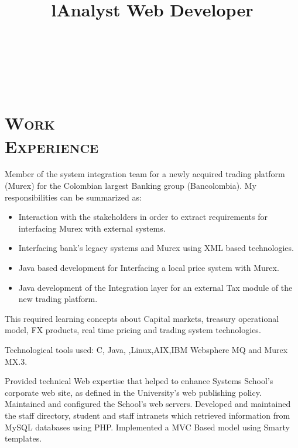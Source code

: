 \begin{resume}
\begin{formatb}
  \title{l}\\
 \\
  \body\\
\end{formatb}

\section{\textsc{Work\\ Experience}}

\title{\textbf{Analyst} }
\begin{position}
Member of the system integration team for a newly acquired  trading
platform (Murex) for the Colombian largest Banking group (Bancolombia). 
My responsibilities can be summarized as:
\begin{itemize}
\item {Interaction with the stakeholders in order to extract requirements for interfacing Murex with external systems.}
\item {Interfacing bank's legacy systems and Murex using XML based technologies.}
\item {Java  based development for Interfacing  a local price system  with Murex.}
\item {Java development of the Integration layer for an external Tax module of the new trading platform.}
\end{itemize} 

This required learning concepts about  Capital markets, treasury operational model, FX products, real time
pricing and trading system technologies.

Technological tools used:
C, Java, \CSharp,Linux,AIX,IBM  Websphere MQ and Murex MX.3.

\end{position}


\title{\textbf{Web Developer} }
\begin{position}
Provided technical Web expertise that helped to enhance Systems School's corporate web site, 
as defined in the University's web publishing policy. Maintained and
configured the School's web servers. Developed and maintained the
staff directory, student and staff intranets which retrieved
information from MySQL databases using PHP. Implemented a MVC Based
model using Smarty templates.
\end{position}


\end{resume}
